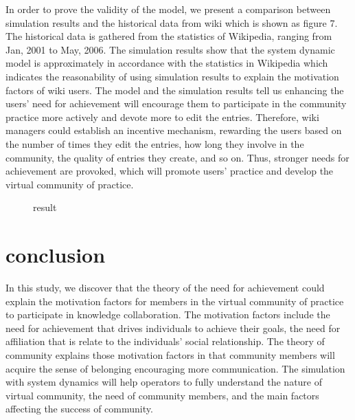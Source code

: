 \documentclass{elsarticle}
\begin{document}
In order to prove the validity of the model, we present a comparison between simulation results and the historical data from wiki which is shown as figure 7. The historical data is gathered from the statistics of Wikipedia, ranging from Jan, 2001 to May, 2006. 
The simulation results show that the system dynamic model is
approximately in accordance with the statistics in Wikipedia which
indicates the reasonability of using simulation results to explain the
motivation factors of wiki users. The model and the simulation results
tell us enhancing the users’ need for achievement will encourage them
to participate in the community practice more actively and devote more
to edit the entries. Therefore, wiki managers could establish an
incentive mechanism, rewarding the users based on the number of times
they edit the entries, how long they involve in the community, the
quality of entries they create, and so on. Thus, stronger needs for
achievement are provoked, which will promote users’ practice and
develop the virtual community of practice. 

\begin{figure}[htpb]
  \centering
  \caption{result}
\end{figure}

\section{conclusion}
\label{sec:conclusion}

 In this study, we discover that the theory of the need for
 achievement could explain the motivation factors for members in the
 virtual community of practice to participate in knowledge
 collaboration. The motivation factors include the need for
 achievement that drives individuals to achieve their goals, the need
 for affiliation that is relate to the individuals’ social
 relationship. The theory of community explains those motivation
 factors in that community members will acquire  the sense of
 belonging encouraging more communication. The simulation with system
 dynamics will help operators to fully understand the nature of
 virtual community, the need of community members, and the main
 factors affecting the success of community.
\end{document}

